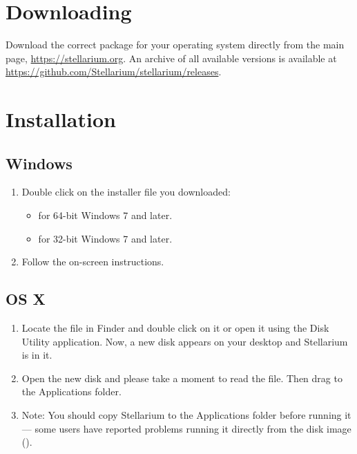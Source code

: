 \section{Downloading}
\label{sec:GettingStarted:Downloading}

Download the correct package for your operating system directly from the main page, \newline \url{https://stellarium.org}.
An archive of all available versions is available at \url{https://github.com/Stellarium/stellarium/releases}.

\section{Installation}
\label{sec:GettingStarted:Installation}

\subsection{Windows}
\label{sec:GettingStarted:Installation:Windows}

\begin{enumerate}
\item Double click on the installer file you downloaded:
\begin{itemize}
\item {} for 64-bit Windows 7 and later.
\item {} for 32-bit Windows 7 and later.
\end{itemize}
\item Follow the on-screen instructions.
\end{enumerate}

\subsection{OS X}
\label{sec:GettingStarted:Installation:OSX}

\begin{enumerate}
\item
  Locate the  file in
  Finder and double click on it or open it using the Disk Utility
  application. Now, a new disk appears on your desktop and Stellarium is
  in it.
\item
  Open the new disk and please take a moment to read the  file.
  Then drag  to the Applications folder.
\item
  Note: You should copy Stellarium to the Applications folder before
  running it --- some users have reported problems running it directly
  from the disk image ().
\end{enumerate}

